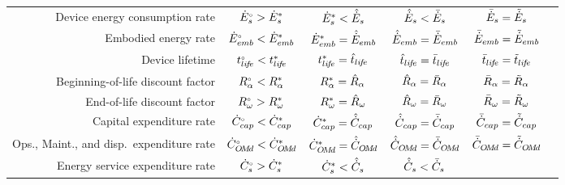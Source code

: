 \begin{landscape}
\begin{table}
\begin{tabular}{r c c c c c}
%
Device energy consumption rate    & ${}{\dot{E}}^{\scriptscriptstyle \circ}_s  > {\dot{E}}^*_s$
                                  & ${\dot{E}}^*_s   < \hat{\dot{E}}_s$ 
                                  & $\hat{\dot{E}}_s   < \bar{\dot{E}}_s$ 
                                  & $\bar{\dot{E}}_s = \tilde{\dot{E}}_s$ \\
%
Embodied energy rate              & ${}{\dot{E}}^{\scriptscriptstyle \circ}_{emb}  < {\dot{E}}^*_{emb}$ 
                                  & ${\dot{E}}^*_{emb}   = \hat{\dot{E}}_{emb}$ 
                                  & $\hat{\dot{E}}_{emb}   = \bar{\dot{E}}_{emb}$ 
                                  & $\bar{\dot{E}}_{emb} = \tilde{\dot{E}}_{emb}$ \\
%
Device lifetime                   & ${}{t}^{\scriptscriptstyle \circ}_{li\!f\!e}  < {t}^*_{li\!f\!e}$ 
                                  & ${t}^*_{li\!f\!e}   = \hat{t}_{li\!f\!e}$ 
                                  & $\hat{t}_{li\!f\!e}   = \bar{t}_{li\!f\!e}$ 
                                  & $\bar{t}_{li\!f\!e} = \tilde{t}_{li\!f\!e}$ \\
%
Beginning-of-life discount factor & ${}{R}^{\scriptscriptstyle \circ}_\alpha  < {R}^*_\alpha$ 
                                  & ${R}^*_\alpha   = \hat{R}_\alpha$ 
                                  & $\hat{R}_\alpha   = \bar{R}_\alpha$ 
                                  & $\bar{R}_\alpha = \tilde{R}_\alpha$ \\
%
End-of-life discount factor       & ${}{R}^{\scriptscriptstyle \circ}_\omega  > {R}^*_\omega$
                                  & ${R}^*_\omega   = \hat{R}_\omega$
                                  & $\hat{R}_\omega   = \bar{R}_\omega$
                                  & $\bar{R}_\omega = \tilde{R}_\omega$ \\
%
Capital expenditure rate          & ${}{\dot{C}}^{\scriptscriptstyle \circ}_{cap}  < {\dot{C}}^*_{cap}$ 
                                  & ${\dot{C}}^*_{cap}   = \hat{\dot{C}}_{cap}$ 
                                  & $\hat{\dot{C}}_{cap}   = \bar{\dot{C}}_{cap}$ 
                                  & $\bar{\dot{C}}_{cap} = \tilde{\dot{C}}_{cap}$ \\
%
Ops., Maint., and disp.\ expenditure rate & ${}{\dot{C}}^{\scriptscriptstyle \circ}_{O\!M\!d} < {\dot{C}}^*_{O\!M\!d}$ 
                                  & ${\dot{C}}^*_{O\!M\!d}   = \hat{\dot{C}}_{O\!M\!d}$ 
                                  & $\hat{\dot{C}}_{O\!M\!d}   = \bar{\dot{C}}_{O\!M\!d}$ 
                                  & $\bar{\dot{C}}_{O\!M\!d} = \tilde{\dot{C}}_{O\!M\!d}$ \\
%
Energy service expenditure rate   & ${}{\dot{C}}^{\scriptscriptstyle \circ}_s  > {\dot{C}}^*_s$
                                  & ${\dot{C}}^*_s   < \hat{\dot{C}}_s$ 
                                  & $\hat{\dot{C}}_s   < \bar{\dot{C}}_s$ 

\end{tabular}
\end{table}
\end{landscape}
